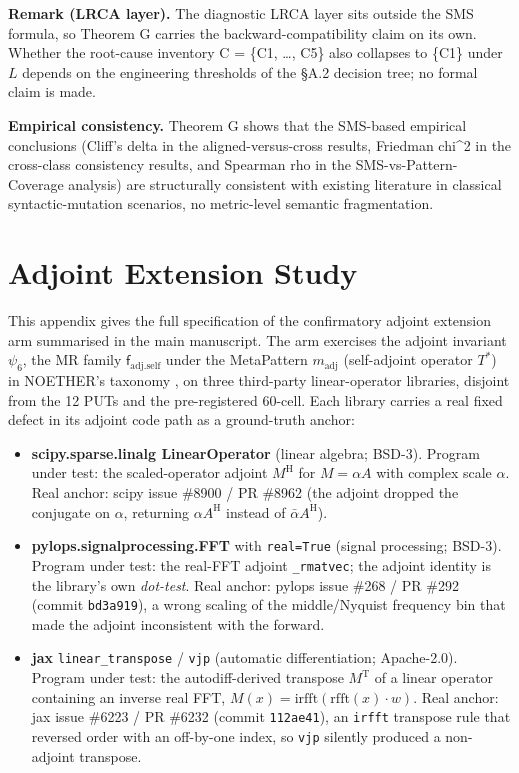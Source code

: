 \documentclass[manuscript,screen,review]{acmart}
\begin{document}
\textbf{Remark (LRCA layer).} The diagnostic LRCA layer sits outside
the SMS formula, so Theorem G carries the backward-compatibility claim
on its own. Whether the root-cause inventory C = \{C1, \ldots, C5\}
also collapses to \{C1\} under $L$ depends on the engineering
thresholds of the §A.2 decision tree; no formal claim is made.

\textbf{Empirical consistency.} Theorem G
shows that the SMS-based empirical conclusions (Cliff's delta in the aligned-versus-cross results,
Friedman chi\^{}2 in the cross-class consistency results, and Spearman rho in the SMS-vs-Pattern-Coverage analysis) are structurally consistent
with existing \citet{jia2011analysis} literature in classical
syntactic-mutation scenarios, no metric-level semantic fragmentation.

\section{Adjoint Extension Study}\label{h.-adjoint-extension-arm}

This appendix gives the full specification of the confirmatory adjoint
extension arm summarised in the main manuscript. The arm
exercises the adjoint invariant $\psi_6$, the MR family
$\mathsf{f}_{\mathrm{adj.self}}$ under the MetaPattern $m_{\mathrm{adj}}$
(self-adjoint operator $T^{*}$) in NOETHER's taxonomy
\citep{noether2026}, on three third-party
linear-operator libraries, disjoint from the 12 PUTs and the
pre-registered 60-cell. Each library carries a real fixed defect in its
adjoint code path as a ground-truth anchor:

\begin{itemize}

\item
  \textbf{scipy.sparse.linalg LinearOperator} (linear algebra; BSD-3).
  Program under test: the scaled-operator adjoint $M^{\mathrm{H}}$ for
  $M = \alpha A$ with complex scale $\alpha$. Real anchor: scipy issue
  \#8900 / PR \#8962 (the adjoint dropped the conjugate on $\alpha$,
  returning $\alpha A^{\mathrm{H}}$ instead of $\bar{\alpha}
  A^{\mathrm{H}}$).
\item
  \textbf{pylops.signalprocessing.FFT} with \texttt{real=True} (signal
  processing; BSD-3). Program under test: the real-FFT adjoint
  \texttt{\_rmatvec}; the adjoint identity is the library's own
  \emph{dot-test}. Real anchor: pylops issue \#268 / PR \#292 (commit
  \texttt{bd3a919}), a wrong scaling of the middle/Nyquist frequency bin
  that made the adjoint inconsistent with the forward.
\item
  \textbf{jax} \texttt{linear\_transpose} / \texttt{vjp} (automatic
  differentiation; Apache-2.0). Program under test: the autodiff-derived
  transpose $M^{\mathrm{T}}$ of a linear operator containing an inverse
  real FFT, $M(x) = \mathrm{irfft}(\mathrm{rfft}(x)\cdot w)$. Real anchor:
  jax issue \#6223 / PR \#6232 (commit \texttt{112ae41}), an
  \texttt{irfft} transpose rule that reversed order with an off-by-one
  index, so \texttt{vjp} silently produced a non-adjoint transpose.
\end{itemize}
\end{document}
